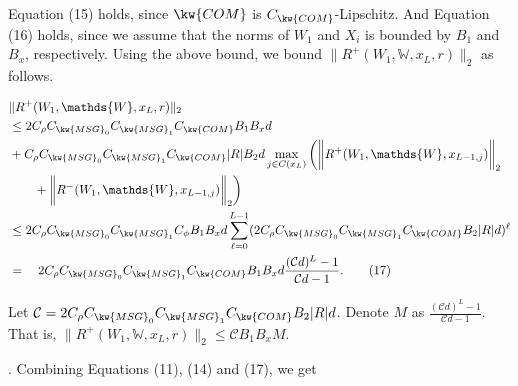 Equation (15) holds, since $\kw{COM}$
is $C_{\kw{COM}}$-Lipschitz.
And Equation (16) holds, since 
we assume that 
the norms of $W_1$ and $X_i$
is bounded by $B_1$ and $B_x$, respectively.
%
Using the above bound, we bound $\|R^+(W_1,\mathds{W},x_L,r)\|_2$ %
as follows.

\begin{align*}
&  \|R^+(W_1,\mathds{W},x_L,r)\|_2 \\
 & \leq 2C_\rho C_{\kw{MSG}_0}C_{\kw{MSG}_1}C_{\kw{COM}} B_1B_xd  \\
 & +  C_\rho C_{\kw{MSG}_0}C_{\kw{MSG}_1}C_{\kw{COM}} |R| 
 B_2d\max_{j\in C(x_L)}\bigg(\bigg\|R^+(W_1,
 \mathds{W},x_{L-1,j})\bigg\|_2\\
 &\quad\quad+\bigg\|R^-(W_1,
 \mathds{W},x_{L-1,j})\bigg\|_2\bigg) \\
 & \leq 2C_\rho C_{\kw{MSG}_0}C_{\kw{MSG}_1}C_\phi B_1B_xd\sum_{\ell=0}^{L-1}(2C_\rho C_{\kw{MSG}_0}C_{\kw{MSG}_1}
 C_{\kw{COM}} B_2 |R| d)^\ell \\
 & =\quad 2C_\rho C_{\kw{MSG}_0}C_{\kw{MSG}_1}C_{\kw{COM}} B_1B_xd\frac{(\mathcal{C}d)^L-1}{\mathcal{C}d-1}. \tag{17}
\end{align*}

Let ${\mathcal C} = 2C_\rho C_{\kw{MSG}_0}C_{\kw{MSG}_1}C_{\kw{COM}} B_2 |R| d$.
Denote $M$ as $\frac{\left(\mathcal{C}d\right)^{L}-1}{\mathcal{C}d-1}$.
That is, $\|R^+(W_1,\mathds{W},x_L,r)\|_2  \leq {\mathcal C} B_1  B_xM$.



.
Combining Equations (11), (14) and (17), 
we get


